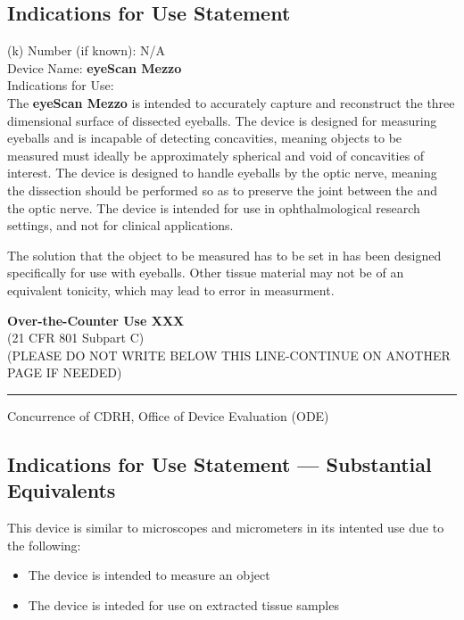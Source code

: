 \newpage
\subsection{Indications for Use Statement}

\onehalfspacing

(k) Number (if known): N/A \\
Device Name: \textbf{eyeScan Mezzo} \\
Indications for Use: \\

The \textbf{eyeScan Mezzo} is intended to accurately capture and
reconstruct the three dimensional surface of dissected eyeballs. The
device is designed for measuring eyeballs and is incapable of
detecting concavities, meaning objects to be measured must ideally be
approximately spherical and void of concavities of interest. The
device is designed to handle eyeballs by the optic nerve, meaning the
dissection should be performed so as to preserve the joint between the
and the optic nerve. The device is intended for use in
ophthalmological research settings, and not for clinical applications.

The solution that the object to be measured has to be set in has been
designed specifically for use with eyeballs. Other tissue material may
not be of an equivalent tonicity, which may lead to error in
measurment.

\vfill

\noindent \textbf{Over-the-Counter Use XXX} \\
(21 CFR 801 Subpart C)\\[1em]

\noindent (PLEASE DO NOT WRITE BELOW THIS LINE-CONTINUE ON ANOTHER PAGE IF
NEEDED)

\rule{\linewidth}{0.5mm}
\begin{center}
  Concurrence of CDRH, Office of Device Evaluation (ODE)
\end{center}

\vspace{5em}

\newpage
\subsection{Indications for Use Statement --- Substantial Equivalents}

This device is similar to microscopes and micrometers in its intented
use due to the following:

\begin{itemize}
\item The device is intended to measure an object
\item The device is inteded for use on extracted tissue samples
\end{itemize}

